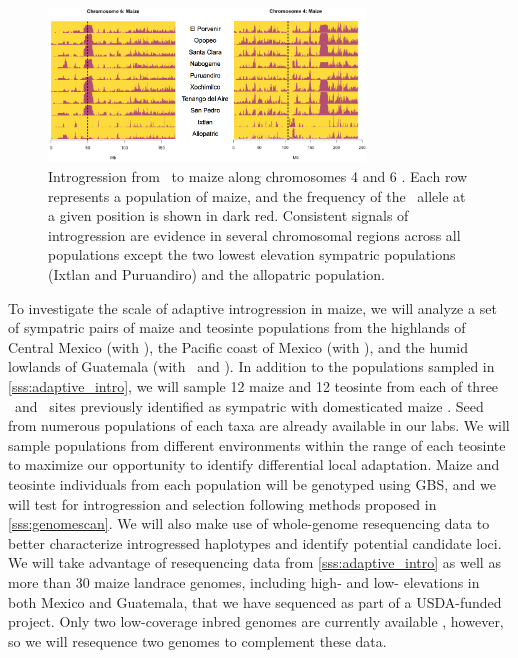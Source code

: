 \begin{figure}[t]
  \centering
   \includegraphics[width=0.75\textwidth]{same_regions}
    \caption{ Introgression from \zm\ to maize along chromosomes 4 and 6 \citep{Hufford2013}. Each row represents a population of maize, and the frequency of the \zm\ allele at a given position is shown in dark red. Consistent signals of introgression are evidence in several chromosomal regions across all populations except the two lowest elevation sympatric populations (Ixtlan and Puruandiro) and the allopatric population.}
\label{fig:sameregions}
\end{figure} 

To investigate the scale of adaptive introgression in maize, we will analyze a set of sympatric pairs of maize and teosinte populations from the highlands of Central Mexico (with \zm), the Pacific coast of Mexico (with \zp), and the humid lowlands of Guatemala (with \zl\ and \zh). 
In addition to the populations sampled in \ref{sss:adaptive_intro}, we will sample 12 maize and 12 teosinte from each of three \zm\ and \zp\ sites previously identified as sympatric with domesticated maize \citep{hufford2010genetic, Hufford2013}.  
Seed from numerous populations of each taxa are already available in our labs.
We will sample populations from different environments within the range of each teosinte to maximize our opportunity to identify differential local adaptation.
Maize and teosinte individuals from each population will be genotyped using GBS, and we will test for introgression and selection following methods proposed in \ref{sss:genomescan}.
We will also make use of whole-genome resequencing data to better characterize introgressed haplotypes and identify potential candidate loci. 
We will take advantage of resequencing data from \ref{sss:adaptive_intro} as well as more than 30 maize landrace genomes, including high- and low- elevations in both Mexico and Guatemala, that we have sequenced as part of a USDA-funded project.  
Only two low-coverage inbred \zm{} genomes are currently available \citep{Chia2012a}, however, so we will resequence two \zm{} genomes to complement these data.

